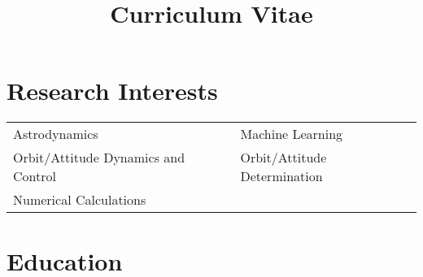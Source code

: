 \documentclass[10pt,a4paper,sans]{moderncv} %
\title{Curriculum Vitae}
\begin{document}
\makecvtitle
\vspace{-35 pt}




\section{Research Interests}



\begin{tabular}{ll}


Astrodynamics  \hspace{12em} & Machine Learning \\
Orbit/Attitude Dynamics and Control \hspace{12em} & Orbit/Attitude Determination  \\
Numerical Calculations \hspace{12em}   \\


\end{tabular}



\section{Education}
\end{document}
